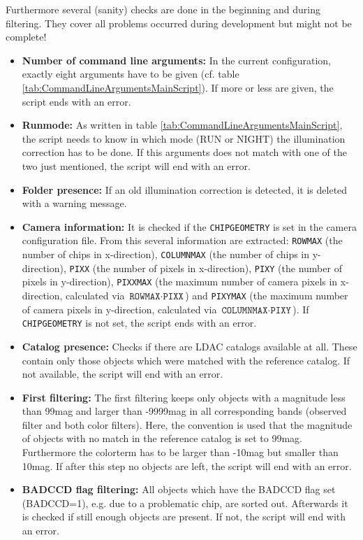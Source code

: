 Furthermore several (sanity) checks are done in the beginning and during filtering. They cover all problems occurred during development but might not be complete!
\begin{itemize}
\item \textbf{Number of command line arguments:} In the current configuration, exactly eight arguments have to be given (cf. table \ref{tab:CommandLineArgumentsMainScript}). If more or less are given, the script ends with an error.
\item \textbf{Runmode:} As written in table \ref{tab:CommandLineArgumentsMainScript}, the script needs to know in which mode (RUN or NIGHT) the illumination correction has to be done. If this arguments does not match with one of the two just mentioned, the script will end with an error.
\item \textbf{Folder presence:} If an old illumination correction is detected, it is deleted with a warning message.
\item \textbf{Camera information:} It is checked if the \texttt{CHIPGEOMETRY} is set in the camera configuration file. From this several information are extracted: \texttt{ROWMAX} (the number of chips in x-direction), \texttt{COLUMNMAX} (the number of chips in y-direction), \texttt{PIXX} (the number of pixels in x-direction), \texttt{PIXY} (the number of pixels in y-direction), \texttt{PIXXMAX} (the maximum number of camera pixels in x-direction, calculated via $\texttt{ROWMAX} \cdot \texttt{PIXX}$) and \texttt{PIXYMAX} (the maximum number of camera pixels in y-direction, calculated via $\texttt{COLUMNMAX} \cdot \texttt{PIXY}$). If \texttt{CHIPGEOMETRY} is not set, the script ends with an error.
\item \textbf{Catalog presence:} Checks if there are LDAC catalogs available at all. These contain only those objects which were matched with the reference catalog. If not available, the script will end with an error.
\item \textbf{First filtering:} The first filtering keeps only objects with a magnitude less than 99mag and larger than -9999mag in all corresponding bands (observed filter and both color filters). Here, the convention is used that the magnitude of objects with no match in the reference catalog is set to 99mag. Furthermore the colorterm has to be larger than -10mag but smaller than 10mag. If after this step no objects are left, the script will end with an error.
\item \textbf{BADCCD flag filtering:} All objects which have the BADCCD flag set (BADCCD=1), e.g. due to a problematic chip, are sorted out. Afterwards it is checked if still enough objects are present. If not, the script will end with an error.

\end{itemize}
